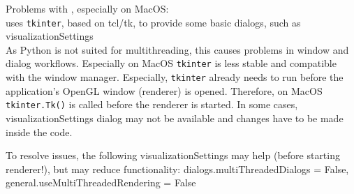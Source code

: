 \item Problems with , especially on MacOS:\\
  \codeName uses \texttt{tkinter}, based on tcl/tk, to provide some basic dialogs, such as visualizationSettings\\
  As Python is not suited for multithreading, this causes problems in window and dialog workflows. Especially on MacOS
  \texttt{tkinter} is less stable and compatible with the window manager. Especially, \texttt{tkinter} already needs to run
  before the application's OpenGL window (renderer) is opened. Therefore, on MacOS \texttt{tkinter.Tk()} is called before the 
  renderer is started.
  In some cases, visualizationSettings dialog may not be available and changes have to be made inside the code.
  
\item[$\ra$] To resolve issues, the following visualizationSettings may help (before starting renderer!), but may reduce functionality: 
     dialogs.multiThreadedDialogs = False, general.useMultiThreadedRendering = False
\ei 



